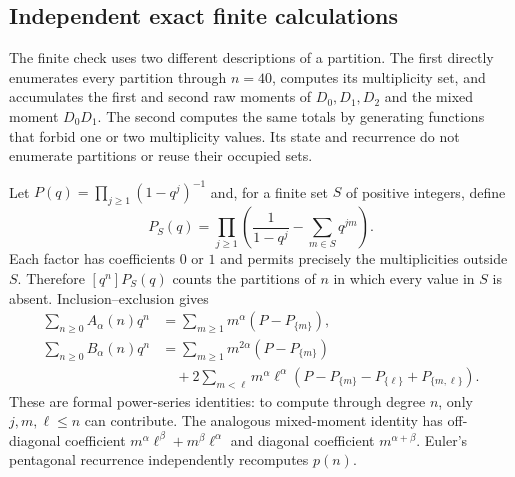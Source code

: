\documentclass[11pt,letterpaper]{article}
\numberwithin{equation}{section}
\theoremstyle{definition}\newtheorem{definition}[theorem]{Definition}
\theoremstyle{remark}\newtheorem{remark}[theorem]{Remark}
\begin{document}
\subsection{Independent exact finite calculations}
The finite check uses two different descriptions of a partition.
The first directly enumerates every partition through $n=40$, computes
its multiplicity set, and accumulates the first and second raw moments
of $D_0,D_1,D_2$ and the mixed moment $D_0D_1$. The second computes
the same totals by generating functions that forbid one or two
multiplicity values. Its state and recurrence do not enumerate
partitions or reuse their occupied sets.

Let $P(q)=\prod_{j\ge1}(1-q^j)^{-1}$ and, for a finite set $S$ of
positive integers, define
\begin{equation}\label{dmv:fl:eq:forbiddenGF}
 P_S(q)=\prod_{j\ge1}
 \left(\frac1{1-q^j}-\sum_{m\in S}q^{jm}\right).
\end{equation}
Each factor has coefficients $0$ or $1$ and permits precisely the
multiplicities outside $S$. Therefore $[q^n]P_S(q)$ counts the
partitions of $n$ in which every value in $S$ is absent.
Inclusion--exclusion gives
\begin{align}\label{dmv:fl:eq:exactmoments}
 \sum_{n\ge0}A_\alpha(n)q^n
 &=\sum_{m\ge1}m^\alpha(P-P_{\{m\}}),\\
 \sum_{n\ge0}B_\alpha(n)q^n
 &=\sum_{m\ge1}m^{2\alpha}(P-P_{\{m\}})\nonumber\\
 &\quad+2\sum_{m<\ell}m^\alpha\ell^\alpha
 (P-P_{\{m\}}-P_{\{\ell\}}+P_{\{m,\ell\}}).
 \nonumber
\end{align}
These are formal power-series identities: to compute through degree
$n$, only $j,m,\ell\le n$ can contribute. The analogous mixed-moment
identity has off-diagonal coefficient
$m^\alpha\ell^\beta+m^\beta\ell^\alpha$ and diagonal coefficient
$m^{\alpha+\beta}$. Euler's pentagonal recurrence independently
recomputes $p(n)$.
\end{document}
